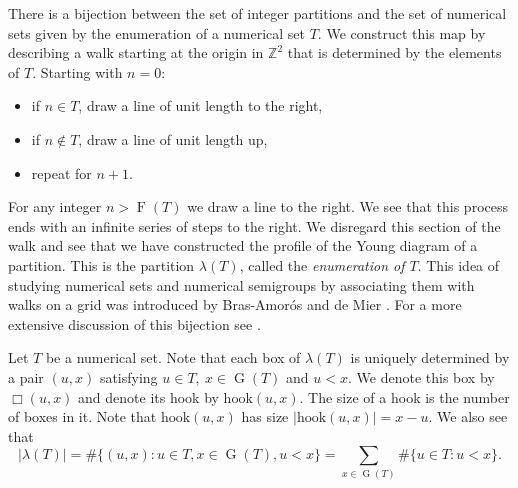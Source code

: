 \documentclass{amsproc}
\newcommand{\Z}{\mathbb{Z}}
\DeclareMathOperator{\F}{F}
\DeclareMathOperator{\G}{G}
\newcommand{\hook}{\text{hook}}
\theoremstyle{definition}
\theoremstyle{remark}
\numberwithin{equation}{section}
\begin{document}
There is a bijection between the set of integer partitions and the set of numerical sets given by the enumeration of a numerical set $T$.  We construct this map by describing a walk starting at the origin in $\Z^2$ that is determined by the elements of $T$.
Starting with $n = 0$:
\begin{itemize}
\item if $n \in T$, draw a line of unit length to the right,
\item if $n \not\in T$, draw a line of unit length up,
\item repeat for $n+1$.
\end{itemize}
For any integer $n > \F(T)$ we draw a line to the right.  We see that this process ends with an infinite series of steps to the right.  We disregard this section of the walk and see that we have constructed the profile of the Young diagram of a partition.  This is the partition $\lambda(T)$, called the \emph{enumeration of $T$}.  This idea of studying numerical sets and numerical semigroups by associating them with walks on a grid was introduced by Bras-Amor\'os and de Mier \cite{BAdM}.  For a more extensive discussion of this bijection see \cite[Section 2]{CONSTANTIN201799}.

Let $T$ be a numerical set. Note that each box of $\lambda(T)$ is uniquely determined by a pair $(u,x)$ satisfying $u\in T,\  x\in \G(T)$ and $u<x$. We denote this box by $\Box(u,x)$ and denote its hook by $\hook(u,x)$. 
The size of a hook is the number of boxes in it. Note that $\hook(u,x)$ has size $|\hook(u,x)|=x-u$.
We also see that
\begin{equation}\label{eqn: formlua size partition}
|\lambda(T)|=\#\{(u,x)\colon u\in T, x\in \G(T), u<x\}=
\sum_{x\in \G(T)}\#\{u\in T\colon u<x\}. 
\end{equation}
\end{document}
